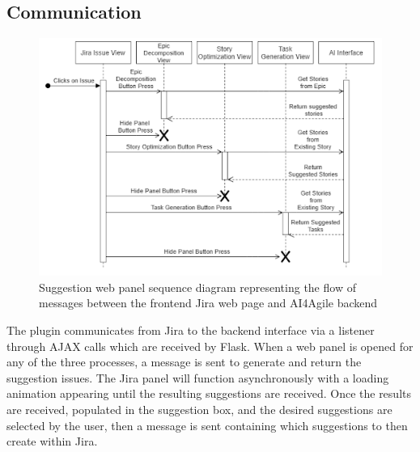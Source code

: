 \subsection{Communication}
\begin{figure}
\centering
\includegraphics[width=\textwidth,keepaspectratio]{./figure/SequenceFlowDiagram.png}
\caption{Suggestion web panel sequence diagram representing the flow of messages between the frontend Jira web page and AI4Agile backend}
\end{figure}

The plugin communicates from Jira to the backend interface via a listener through AJAX calls which are received by Flask. When a web panel is opened for any of the three processes, a message is sent to generate and return the suggestion issues. The Jira panel will function asynchronously with a loading animation appearing until the resulting suggestions are received. Once the results are received, populated in the suggestion box, and the desired suggestions are selected by the user, then a message is sent containing which suggestions to then create within Jira.

